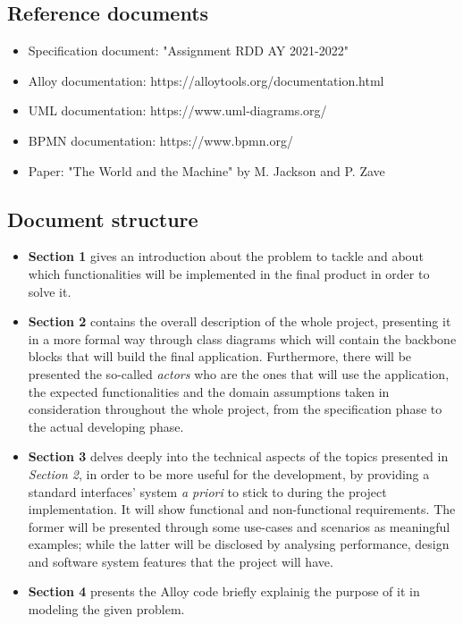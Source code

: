 \documentclass[table, 12pt]{article}
\begin{document}
\subsection{Reference documents}
\begin{itemize}
    \item Specification document: "Assignment RDD AY 2021-2022"
    \item Alloy documentation: https://alloytools.org/documentation.html
    \item UML documentation: https://www.uml-diagrams.org/
    \item BPMN documentation: https://www.bpmn.org/
    \item Paper: "The World and the Machine" by M. Jackson and P. Zave
\end{itemize}

\subsection{Document structure}
\begin{itemize}
    \item \textbf{Section 1} gives an introduction about the problem to tackle and about which functionalities will be implemented in the final product in order to solve it.
    \item \textbf{Section 2} contains the overall description of the whole project, presenting it in a more formal way through class diagrams which will contain the backbone blocks that will build the final application. Furthermore, there will be presented the so-called \emph{actors} who are the ones that will use the application, the expected functionalities and the domain assumptions taken in consideration throughout the whole project, from the specification phase to the actual developing phase.
    \item \textbf{Section 3} delves deeply into the technical aspects of the topics presented in \emph{Section 2}, in order to be more useful for the development, by providing a standard interfaces' system \textit{a priori} to  stick to during the project implementation. It will show functional and non-functional requirements. The former will be presented through some use-cases and scenarios as meaningful examples; while the latter will be disclosed by analysing performance, design and software system features that the project will have.
    \item \textbf{Section 4} presents the Alloy code briefly explainig the purpose of it in modeling the given problem.
\end{itemize}
\end{document}
